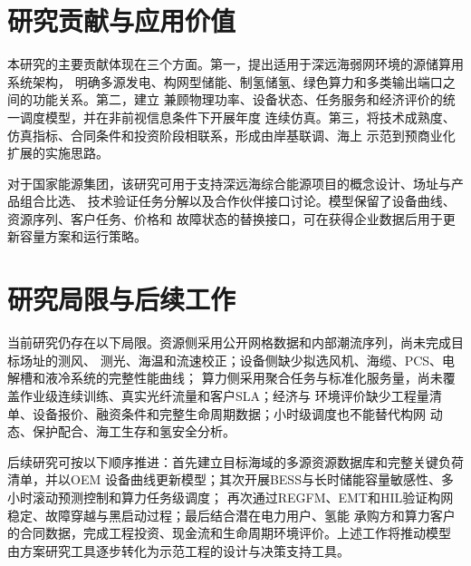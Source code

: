 \section{研究贡献与应用价值}

本研究的主要贡献体现在三个方面。第一，提出适用于深远海弱网环境的源储算用系统架构，
明确多源发电、构网型储能、制氢储氢、绿色算力和多类输出端口之间的功能关系。第二，建立
兼顾物理功率、设备状态、任务服务和经济评价的统一调度模型，并在非前视信息条件下开展年度
连续仿真。第三，将技术成熟度、仿真指标、合同条件和投资阶段相联系，形成由岸基联调、海上
示范到预商业化扩展的实施思路。

对于国家能源集团，该研究可用于支持深远海综合能源项目的概念设计、场址与产品组合比选、
技术验证任务分解以及合作伙伴接口讨论。模型保留了设备曲线、资源序列、客户任务、价格和
故障状态的替换接口，可在获得企业数据后用于更新容量方案和运行策略。

\section{研究局限与后续工作}

当前研究仍存在以下局限。资源侧采用公开网格数据和内部潮流序列，尚未完成目标场址的测风、
测光、海温和流速校正；设备侧缺少拟选风机、海缆、PCS、电解槽和液冷系统的完整性能曲线；
算力侧采用聚合任务与标准化服务量，尚未覆盖作业级连续训练、真实光纤流量和客户SLA；经济与
环境评价缺少工程量清单、设备报价、融资条件和完整生命周期数据；小时级调度也不能替代构网
动态、保护配合、海工生存和氢安全分析。

后续研究可按以下顺序推进：首先建立目标海域的多源资源数据库和完整关键负荷清单，并以OEM
设备曲线更新模型；其次开展BESS与长时储能容量敏感性、多小时滚动预测控制和算力任务级调度；
再次通过REGFM、EMT和HIL验证构网稳定、故障穿越与黑启动过程；最后结合潜在电力用户、氢能
承购方和算力客户的合同数据，完成工程投资、现金流和生命周期环境评价。上述工作将推动模型
由方案研究工具逐步转化为示范工程的设计与决策支持工具。
